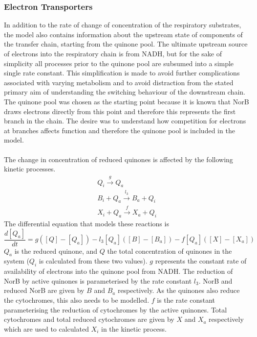 \subsubsection{Electron Transporters}

In addition to the rate of change of concentration of the respiratory substrates, the model also contains information about the upstream state of components of the transfer chain, starting from the quinone pool. The ultimate upstream source of electrons into the respiratory chain is from NADH, but for the sake of simplicity all processes prior to the quinone pool are subsumed into a simple single rate constant. This simplification is made to avoid further complications associated with varying metabolism and to avoid distraction from the stated primary aim of understanding the switching behaviour of the downstream chain. The quinone pool was chosen as the starting point because it is known that NorB draws electrons directly from this point and therefore this represents the first branch in the chain. The desire was to understand how competition for electrons at branches affects function and therefore the quinone pool is included in the model.\\
\clearpage
{}\\
The change in concentration of reduced quinones is affected by the following kinetic processes.
\begin{equation*}
\begin{gathered}
Q_i \xrightarrow{g} Q_a\\
B_i + Q_a \xrightarrow{l_3} B_a + Q_i\\
X_i + Q_a \xrightarrow{f} X_a + Q_i
\end{gathered}
\end{equation*}
The differential equation that models these reactions is
\begin{equation}
\frac{d[Q_a]}{dt} = g([Q] - [Q_a]) - l_3[Q_a]([B] - [B_a]) - f[Q_a]([X]-[X_a])
\label{eq:quinones}
\end{equation}
$Q_a$ is the reduced quinone, and $Q$ the total concentration of quinones in the system ($Q_i$ is calculated from these two values). $g$ represents the constant rate of availability of electrons into the quinone pool from NADH. The reduction of NorB by active quinones is parameterised by the rate constant $l_3$. NorB and reduced NorB are given by $B$ and $B_a$ respectively. As the quinones also reduce the cytochromes, this also needs to be modelled. $f$ is the rate constant parameterising the reduction of cytochromes by the active quinones. Total cytochromes and total reduced cytochromes are given by $X$ and $X_a$ respectively which are used to calculated $X_i$ in the kinetic process.\\
